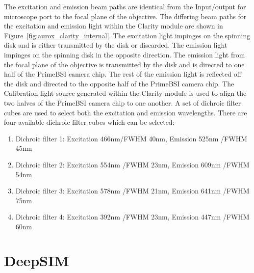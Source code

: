 The excitation and emission beam paths are identical from the Input/output for microscope port to the focal plane of the objective. The differing beam paths for the excitation and emission light within the Clarity module are shown in Figure~\ref{fig:aurox_clarity_internal}. The excitation light impinges on the spinning disk and is either transmitted by the disk or discarded. The emission light impinges on the spinning disk in the opposite direction. The emission light from the focal plane of the objective is transmitted by the disk and is directed to one half of the PrimeBSI camera chip. The rest of the emission light is reflected off the disk and directed to the opposite half of the PrimeBSI camera chip. The Calibration light source generated within the Clarity module is used to align the two halves of the PrimeBSI camera chip to one another. A set of dichroic filter cubes are used to select both the excitation and emission wavelengths. There are four available dichroic filter cubes which can be selected:

\begin{enumerate}
	\item Dichroic filter 1: Excitation 466nm/FWHM 40nm, Emission 525nm /FWHM 45nm
	\item Dichroic filter 2: Excitation 554nm /FWHM 23nm, Emission 609nm /FWHM 54nm
	\item Dichroic filter 3: Excitation 578nm /FWHM 21nm, Emission 641nm /FWHM 75nm
	\item Dichroic filter 4: Excitation 392nm /FWHM 23nm, Emission 447nm /FWHM 60nm  
\end{enumerate}

\section{DeepSIM}
\label{sec:DeepSIM}

